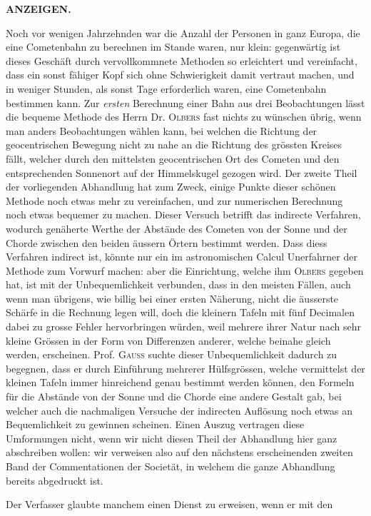 \thispagestyle{gaussVICometReviewGathering}
\clearpage
\thispagestyle{empty}
\noindent{}%
%
\parbox[t]{\dimexpr\linewidth-24mm\relax}{\centering\footnotesize\bfseries ANZEIGEN.\par}%
\makebox[12mm][r]{}\par\nobreak\medskip
Noch vor wenigen Jahrzehnden war die Anzahl der Personen in ganz Europa,
die eine Cometenbahn zu berechnen im Stande waren, nur klein: gegenwärtig
ist dieses Geschäft durch vervollkommnete Methoden so erleichtert und
vereinfacht, dass ein sonst fähiger Kopf sich ohne Schwierigkeit damit vertraut
machen, und in weniger Stunden, als sonst Tage erforderlich waren, eine Cometenbahn
bestimmen kann. Zur \textit{ersten} Berechnung einer Bahn aus drei Beobachtungen
lässt die bequeme Methode des Herrn Dr. \textsc{Olbers} fast nichts zu wünschen
übrig, wenn man anders Beobachtungen wählen kann, bei welchen die
Richtung der geocentrischen Bewegung nicht zu nahe an die Richtung des grössten
Kreises fällt, welcher durch den mittelsten geocentrischen Ort des Cometen
und den entsprechenden Sonnenort auf der Himmelskugel gezogen wird. Der
zweite Theil der vorliegenden Abhandlung hat zum Zweck, einige Punkte dieser
schönen Methode noch etwas mehr zu vereinfachen, und zur numerischen
Berechnung noch etwas bequemer zu machen. Dieser Versuch betrifft das indirecte
Verfahren, wodurch genäherte Werthe der Abstände des Cometen von der
Sonne und der Chorde zwischen den beiden äussern Örtern bestimmt werden.
Dass diess Verfahren indirect ist, könnte nur ein im astronomischen Calcul Unerfahrner
der Methode zum Vorwurf machen: aber die Einrichtung, welche ihm
\textsc{Olbers} gegeben hat, ist mit der Unbequemlichkeit verbunden, dass in den meisten
Fällen, auch wenn man übrigens, wie billig bei einer ersten Näherung, nicht
die äusserste Schärfe in die Rechnung legen will, doch die kleinern Tafeln mit
fünf Decimalen dabei zu grosse Fehler hervorbringen würden, weil mehrere ihrer
Natur nach sehr kleine Grössen in der Form von Differenzen anderer, welche
beinahe gleich werden, erscheinen. Prof. \textsc{Gauss} suchte dieser Unbequemlichkeit
dadurch zu begegnen, dass er durch Einführung mehrerer Hülfsgrössen,
welche vermittelst der kleinen Tafeln immer hinreichend genau bestimmt werden
können, den Formeln für die Abstände von der Sonne und die Chorde eine andere
Gestalt gab, bei welcher auch die nachmaligen Versuche der indirecten Auflösung
noch etwas an Bequemlichkeit zu gewinnen scheinen. Einen Auszug vertragen
diese Umformungen nicht, wenn wir nicht diesen Theil der Abhandlung
hier ganz abschreiben wollen: wir verweisen also auf den nächstens erscheinenden
zweiten Band der Commentationen der Societät, in welchem die ganze Abhandlung
bereits abgedruckt ist.

Der Verfasser glaubte manchem einen Dienst zu erweisen, wenn er mit den
\par\clearpage
\endgroup
